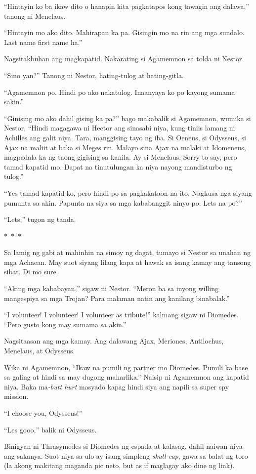 \documentclass[12pt,letterpaper]{report}
\newcommand{\seperate}{\begin{center}$\ast$~$\ast$~$\ast$\end{center}}
\begin{document}
``Hintayin ko ba ikaw dito o hanapin kita pagkatapos kong tawagin ang dalawa,'' tanong ni Menelaus.

``Hintayin mo ako dito. Mahirapan ka pa. Gisingin mo na rin ang mga sundalo. Last name first name ha.''

Nagsitakbuhan ang magkapatid. Nakarating si Agamemnon sa tolda ni Nestor.

``Sino yan?'' Tanong ni Nestor, hating-tulog at hating-gitla.

``Agamemnon po. Hindi po ako nakatulog. Inaanyaya ko po kayong sumama sakin.''

``Ginising mo ako dahil gising ka pa?'' bago makabalik si Agamemnon, wumika si Nestor, ``Hindi magagawa ni Hector ang sinasabi niya, kung tiniis lamang ni Achilles ang galit niya. Tara, manggising tayo ng iba. Si Oeneus, si Odysseus, si Ajax na maliit at baka si Meges rin. Malayo sina Ajax na malaki at Idomeneus, magpadala ka ng taong gigising sa kanila. Ay si Menelaus. Sorry to say, pero tamad kapatid mo. Dapat na tinutulungan ka niya nayong mandisturbo ng tulog.''

``Yes tamad kapatid ko, pero hindi po sa pagkakataon na ito. Nagkusa nga siyang pumunta sa akin. Papunta na siya sa mga kababanggit ninyo po. Lets na po?''

``Lets,'' tugon ng tanda.

\seperate

Sa lamig ng gabi at mahinhin na simoy ng dagat, tumayo si Nestor sa unahan ng mga Achaean. May suot siyang lilang kapa at hawak sa isang kamay ang tansong sibat. Di mo sure.

``Aking mga kababayan,'' sigaw ni Nestor. ``Meron ba sa inyong willing mangespiya sa mga Trojan? Para malaman natin ang kanilang binabalak.''

``I volunteer! I volunteer! I volunteer as tribute!'' kalmang sigaw ni Diomedes. ``Pero gusto kong may sumama sa akin.''

Nagsitaasan ang mga kamay. Ang dalawang Ajax, Meriones, Antilochus, Menelaus, at Odysseus.

Wika ni Agamemnon, ``Ikaw na pumili ng partner mo Diomedes. Pumili ka base sa galing at hindi sa may dugong maharlika.'' Naisip ni Agamemnon ang kapatid niya. Baka ma\textit{-butt hurt} masyado kapag hindi siya ang napili sa super spy mission.

``I choose you, Odysseus!''

``Les gooo,'' balik ni Odysseus.

Binigyan ni Thrasymedes si Diomedes ng espada at kalasag, dahil naiwan niya ang sakanya. Suot niya sa ulo ay isang simpleng \textit{skull-cap}, gawa sa balat ng toro (la akong makitang maganda pic neto, but as if maglagay ako dine ng link).
\end{document}

